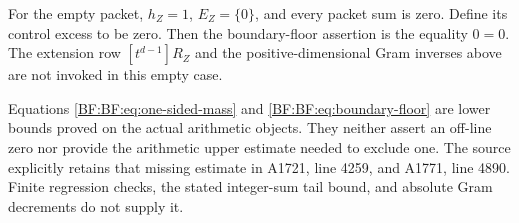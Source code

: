 For the empty packet, \(h_Z=1\), \(E_Z=\{0\}\), and every
packet sum is zero.  Define its control excess to be zero.
Then the boundary-floor assertion is the equality \(0=0\).
The extension row \([t^{d-1}]R_Z\) and the positive-dimensional
Gram inverses above are not invoked in this empty case.

Equations \eqref{BF:BF:eq:one-sided-mass} and
\eqref{BF:BF:eq:boundary-floor} are lower bounds proved on the
actual arithmetic objects.  They neither assert an off-line
zero nor provide the arithmetic upper estimate needed to
exclude one.  The source explicitly retains that missing
estimate in A1721, line 4259, and A1771, line 4890.
Finite regression checks, the stated integer-sum tail bound,
and absolute Gram decrements do not supply it.


